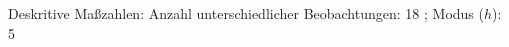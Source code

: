 				\label{tableValues:adem05a_g2d}
				\vspace*{-\baselineskip}
                    \begin{noten}
                	    \note{} Deskritive Maßzahlen:
                	    Anzahl unterschiedlicher Beobachtungen: 18%
                	    ; 
                	      Modus ($h$): 5
                     \end{noten}


